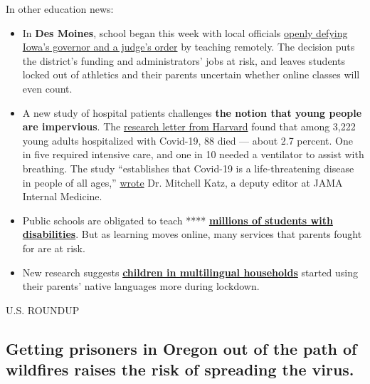In other education news:

\begin{itemize}
\item
  In \textbf{Des Moines}, school began this week with local officials
  \href{https://www.nytimes3xbfgragh.onion/2020/09/10/us/des-moines-school-opening-coronavirus.html}{openly
  defying Iowa's governor and a judge's order} by teaching remotely. The
  decision puts the district's funding and administrators' jobs at risk,
  and leaves students locked out of athletics and their parents
  uncertain whether online classes will even count.
\item
  A new study of hospital patients challenges \textbf{the notion that
  young people are impervious}. The
  \href{https://jamanetwork.com/journals/jamainternalmedicine/fullarticle/2770542?guestAccessKey=87e8344a-8e2f-4ca8-8e1a-95be53bbf71e\&utm_source=silverchair\&utm_medium=email\&utm_campaign=article_alert-jamainternalmedicine\&utm_content=olf\&utm_term=090920}{research
  letter from Harvard} found that among 3,222 young adults hospitalized
  with Covid-19, 88 died --- about 2.7 percent. One in five required
  intensive care, and one in 10 needed a ventilator to assist with
  breathing. The study ``establishes that Covid-19 is a life-threatening
  disease in people of all ages,''
  \href{https://jamanetwork.com/journals/jamainternalmedicine/fullarticle/2770541?guestAccessKey=8633865c-3c11-4ce2-9449-887ca6580677\&utm_source=silverchair\&utm_medium=email\&utm_campaign=article_alert-jamainternalmedicine\&utm_content=olf\&utm_term=090920}{wrote}
  Dr. Mitchell Katz, a deputy editor at JAMA Internal Medicine.
\item
  Public schools are obligated to teach ****
  \textbf{\href{https://www.nytimes3xbfgragh.onion/interactive/2020/09/10/magazine/special-education-covid.html?action=click\&pgtype=Article\&state=default\&module=styln-coronavirus-schools-reopening\&region=MAIN_CONTENT_3\&context=storylines_keepup}{millions
  of students with disabilities}}. But as learning moves online, many
  services that parents fought for are at risk.
\item
  New research suggests
  \textbf{\href{https://www.nytimes3xbfgragh.onion/2020/09/10/parenting/family-second-language-coronavirus.html}{children
  in multilingual households}} started using their parents' native
  languages more during lockdown.
\end{itemize}

U.S. ROUNDUP

\hypertarget{getting-prisoners-in-oregon-out-of-the-path-of-wildfires-raises-the-risk-of-spreading-the-virus}{%
\subsection{Getting prisoners in Oregon out of the path of wildfires
raises the risk of spreading the
virus.}\label{getting-prisoners-in-oregon-out-of-the-path-of-wildfires-raises-the-risk-of-spreading-the-virus}}

